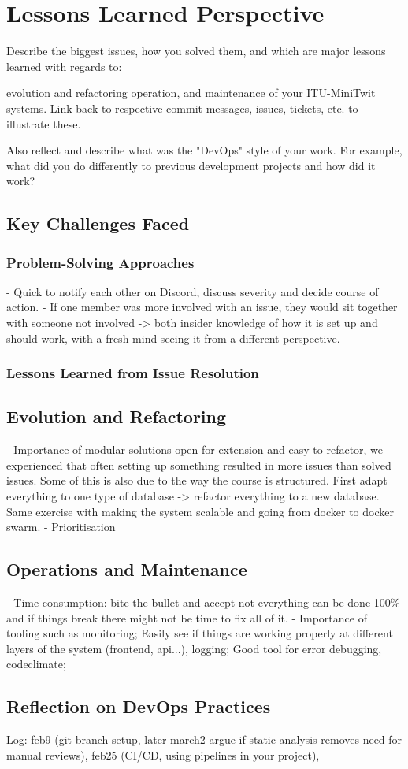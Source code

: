 \section{Lessons Learned Perspective}
Describe the biggest issues, how you solved them, and which are major lessons learned with regards to:

evolution and refactoring
operation, and
maintenance
of your ITU-MiniTwit systems. Link back to respective commit messages, issues, tickets, etc. to illustrate these.

Also reflect and describe what was the "DevOps" style of your work. For example, what did you do differently to previous development projects and how did it work?


\subsection{Key Challenges Faced}
\subsubsection*{Problem-Solving Approaches}
- Quick to notify each other on Discord, discuss severity and decide course of action. 
- If one member was more involved with an issue, they would sit together with someone not involved -> both insider knowledge of how it is set up and should work, with a fresh mind seeing it from a different perspective.

\subsubsection*{Lessons Learned from Issue Resolution}
\subsection{Evolution and Refactoring}
- Importance of modular solutions open for extension and easy to refactor, we experienced that often setting up something resulted in more issues than solved issues. Some of this is also due to the way the course is structured. First adapt everything to one type of database -> refactor everything to a new database. Same exercise with making the system scalable and going from docker to docker swarm.
- Prioritisation
\subsection{Operations and Maintenance}
- Time consumption: bite the bullet and accept not everything can be done 100\% and if things break there might not be time to fix all of it.
- Importance of tooling such as monitoring; Easily see if things are working properly at different layers of the system (frontend, api...), logging; Good tool for error debugging, codeclimate; 

\subsection{Reflection on DevOps Practices}
Log: feb9 (git branch setup, later march2 argue if static analysis removes need for manual reviews), feb25 (CI/CD, using pipelines in your project),  